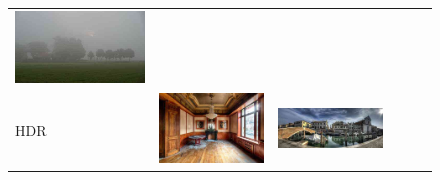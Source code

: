 \begin{figure}
\begin{minipage}[t]{\textwidth}
\begin{tabular}{m{.01\linewidth} m{.16\linewidth} m{.16\linewidth} m{.16\linewidth} m{.16\linewidth} m{.16\linewidth}}
    \includegraphics[width=\linewidth]{../style/figures/flickr_on_flickr/pred_style_Hazy/4.jpg} \\
    \begin{turn}{90}\small{HDR}\end{turn} &
    \includegraphics[width=\linewidth]{../style/figures/flickr_on_flickr/pred_style_HDR/0.jpg} &
    \includegraphics[width=\linewidth]{../style/figures/flickr_on_flickr/pred_style_HDR/1.jpg} &

\end{tabular}
\end{minipage}
\end{figure}
